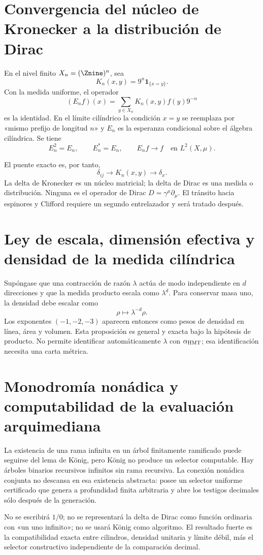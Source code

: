 \section{Convergencia del núcleo de Kronecker a la distribución de Dirac}

En el nivel finito \(X_n=(\Znine)^n\), sea
\[
K_n(x,y)=9^n\mathbf1_{\{x=y\}}.
\]
Con la medida uniforme, el operador
\[
(E_nf)(x)=\sum_{y\in X_n}K_n(x,y)f(y)9^{-n}
\]
es la identidad. En el límite cilíndrico la condición \(x=y\) se reemplaza por
«mismo prefijo de longitud \(n\)» y \(E_n\) es la esperanza condicional sobre
el álgebra cilíndrica. Se tiene
\[
E_n^2=E_n,\qquad E_n^*=E_n,\qquad E_nf\to f
\quad\text{en }L^2(X,\mu).
\]

El puente exacto es, por tanto,
\[
\delta_{ij}
\longrightarrow K_n(x,y)
\longrightarrow\delta_x.
\]
La delta de Kronecker es un núcleo matricial; la delta de Dirac es una medida o
distribución. Ninguna es el operador de Dirac
\(D=\gamma^\mu\partial_\mu\). El tránsito hacia espinores y Clifford requiere
un segundo entrelazador y será tratado después.

\section{Ley de escala, dimensión efectiva y densidad de la medida cilíndrica}

Supóngase que una contracción de razón \(\lambda\) actúa de modo independiente
en \(d\) direcciones y que la medida producto escala como \(\lambda^d\). Para
conservar masa uno, la densidad debe escalar como
\[
\rho\longmapsto\lambda^{-d}\rho.
\]
Los exponentes \((-1,-2,-3)\) aparecen entonces como pesos de densidad en línea,
área y volumen. Esta proposición es general y exacta bajo la hipótesis de
producto. No permite identificar automáticamente \(\lambda\) con
\(\alpha_{\rm HMT}\); esa identificación necesita una carta métrica.

\section{Monodromía nonádica y computabilidad de la evaluación arquimediana}

La existencia de una rama infinita en un árbol finitamente ramificado puede
seguirse del lema de König, pero König no produce un selector computable. Hay
árboles binarios recursivos infinitos sin rama recursiva. La conexión nonádica
conjunta no descansa en esa existencia abstracta: posee un selector uniforme
certificado que genera a profundidad finita arbitraria y abre los testigos
decimales sólo después de la generación.

\begin{falsadorBox}[title={Tres confusiones prohibidas}]
No se escribirá \(1/0\); no se representará la delta de Dirac como función
ordinaria con «un uno infinito»; no se usará König como algoritmo. El resultado
fuerte es la compatibilidad exacta entre cilindros, densidad unitaria y límite
débil, más el selector constructivo independiente de la comparación decimal.
\end{falsadorBox}

